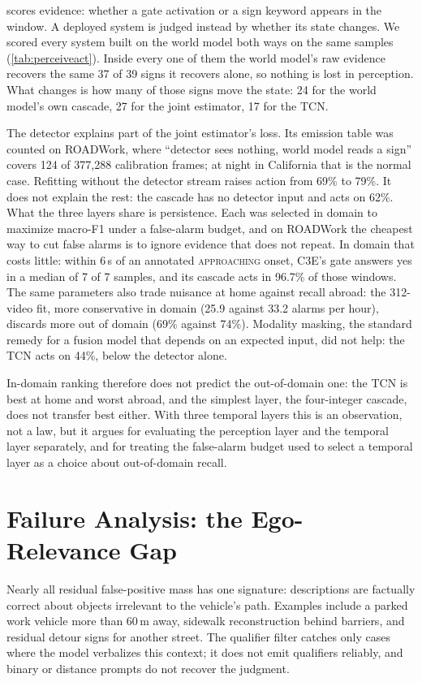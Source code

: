 \documentclass[journal]{IEEEtran}
\begin{document}
 scores evidence: whether a gate activation or a sign keyword appears in the window.  A deployed system is judged instead by whether its state changes.  We scored every system built on the world model both ways on the same samples (\cref{tab:perceiveact}).  Inside every one of them the world model's raw evidence recovers the same 37 of 39 signs it recovers alone, so nothing is lost in perception.  What changes is how many of those signs move the state: 24 for the world model's own cascade, 27 for the joint estimator, 17 for the TCN.

The detector explains part of the joint estimator's loss.  Its emission table was counted on ROADWork, where ``detector sees nothing, world model reads a sign'' covers 124 of 377{,}288 calibration frames; at night in California that is the normal case.  Refitting without the detector stream raises action from 69\% to 79\%.  It does not explain the rest: the cascade has no detector input and acts on 62\%.  What the three layers share is persistence.  Each was selected in domain to maximize macro-F1 under a false-alarm budget, and on ROADWork the cheapest way to cut false alarms is to ignore evidence that does not repeat.  In domain that costs little: within 6\,s of an annotated \textsc{approaching} onset, C3E's gate answers yes in a median of 7 of 7 samples, and its cascade acts in 96.7\% of those windows.  The same parameters also trade nuisance at home against recall abroad: the 312-video fit, more conservative in domain (25.9 against 33.2 alarms per hour), discards more out of domain (69\% against 74\%).  Modality masking, the standard remedy for a fusion model that depends on an expected input, did not help: the TCN acts on 44\%, below the detector alone.

In-domain ranking therefore does not predict the out-of-domain one: the TCN is best at home and worst abroad, and the simplest layer, the four-integer cascade, does not transfer best either.  With three temporal layers this is an observation, not a law, but it argues for evaluating the perception layer and the temporal layer separately, and for treating the false-alarm budget used to select a temporal layer as a choice about out-of-domain recall.

\section{Failure Analysis: the Ego-Relevance Gap}
\label{sec:analysis}

Nearly all residual false-positive mass has one signature: descriptions are factually correct about objects irrelevant to the vehicle's path.  Examples include a parked work vehicle more than 60\,m away, sidewalk reconstruction behind barriers, and residual detour signs for another street.  The qualifier filter catches only cases where the model verbalizes this context; it does not emit qualifiers reliably, and binary or distance prompts do not recover the judgment.
\end{document}
